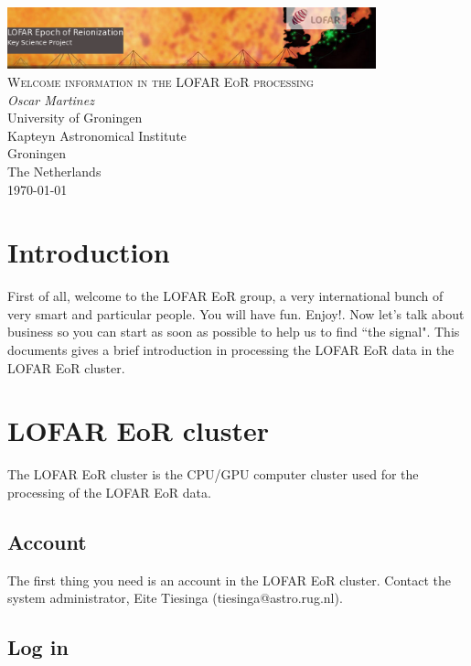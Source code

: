 \documentclass[a4paper,11pt]{article}
\begin{document}
\begin{titlepage}
\begin{center}
\includegraphics[width=0.8\textwidth]{fig/eorlogo}\\[3cm]    
\textsc{\LARGE Welcome information in the LOFAR EoR processing}\\[0.5cm]
\vfill
{\large 
\emph{Oscar Martinez} \\
University of Groningen \\ 
Kapteyn Astronomical Institute \\
Groningen \\
The Netherlands \\
\today}
\end{center}
\end{titlepage}

\section{Introduction}

First of all, welcome to the LOFAR EoR group, a very international bunch of very smart and particular people. You will have fun. Enjoy!. Now let's talk about business so you can start as soon as possible to help us to find ``the signal". This documents gives a brief introduction in processing the LOFAR EoR data in the LOFAR EoR cluster.

\section{LOFAR EoR cluster}

The LOFAR EoR cluster is the CPU/GPU computer cluster used for the processing of the LOFAR EoR data. 

\subsection*{Account}

The first thing you need is an account in the LOFAR EoR cluster. Contact the system administrator, Eite Tiesinga (tiesinga@astro.rug.nl).

\subsection*{Log in}
\end{document}
